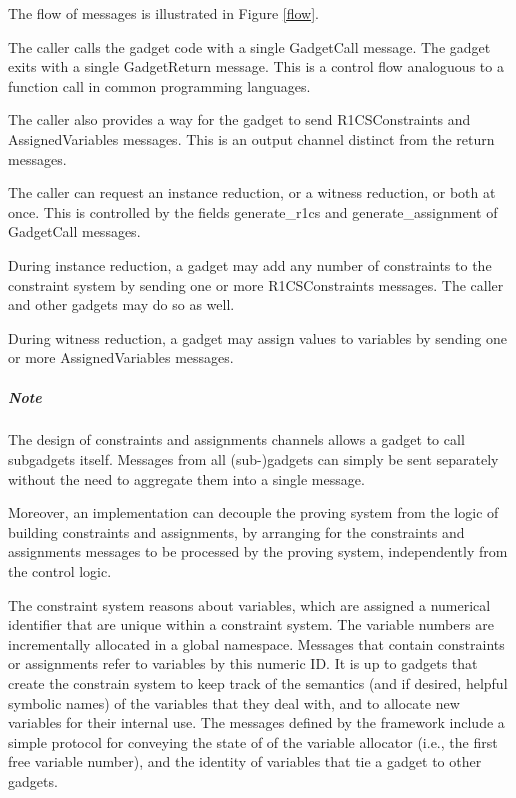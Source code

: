 
	The flow of messages is illustrated in Figure \ref{flow}.

	The caller calls the gadget code with a single \textsf{GadgetCall} message.
	The gadget exits with a single GadgetReturn message.
	This is a control flow analoguous to a function call in common programming languages.

	The caller also provides a way for the gadget to send
	R1CSConstraints and AssignedVariables messages.
	This is an output channel distinct from the return messages.

	The caller can request an instance reduction, or a witness reduction, or both at once.
	This is controlled by the fields generate\_r1cs and generate\_assignment of GadgetCall messages.

	During instance reduction,
	a gadget may add any number of constraints to the constraint system
	by sending one or more R1CSConstraints messages.
	The caller and other gadgets may do so as well.

	During witness reduction,
	a gadget may assign values to variables
	by sending one or more AssignedVariables messages.

	\subparagraph{Note}
	The design of constraints and assignments channels
	allows a gadget to call subgadgets itself.
	Messages from all (sub-)gadgets can simply be sent separately
	without the need to aggregate them into a single message.
	
	Moreover, an implementation can decouple the proving system
	from the logic of building constraints and assignments,
	by arranging for the constraints and assignments messages
	to be processed by the proving system, independently from the control logic.

	The constraint system reasons about variables, which are assigned a numerical identifier that are unique within a constraint system. The variable numbers are incrementally allocated in a global namespace. Messages that contain constraints or assignments refer to variables by this numeric ID. It is up to gadgets that create the constrain system to keep track of the semantics (and if desired, helpful symbolic names) of the variables that they deal with, and to allocate new variables for their internal use. The messages defined by the framework include a simple protocol for conveying the state of of the variable allocator (i.e., the first free variable number), and the identity of variables that tie a gadget to other gadgets.

